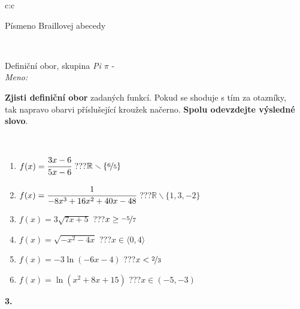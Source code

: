\documentclass[10pt]{report}
\begin{document}
\begin{tabular}{c:c}
\begin{minipage}[c][104.5mm][t]{0.5\linewidth}
\begin{center}
\begin{minipage}{0.20\linewidth}
\begin{center}
{\small Písmeno Braillovej abecedy}
\end{center}
\end{minipage}
\end{center}
\end{minipage}
\\ \hdashline
\begin{minipage}[c][104.5mm][t]{0.5\linewidth}
\begin{center}
\vspace{7mm}
{\huge Definiční obor, skupina \textit{Pi $\pi$} -}\\[5mm]
\textit{Meno:}\phantom{xxxxxxxxxxxxxxxxxxxxxxxxxxxxxxxxxxxxxxxxxxxxxxxxxxxxxxxxxxxxxxxxx}\\[5mm]
\begin{minipage}{0.95\linewidth}
\textbf{Zjisti definiční obor} zadaných funkcí. Pokud se shoduje s tím za otazníky,\\tak napravo obarvi příslušející kroužek načerno. \textbf{Spolu odevzdejte výsledné slovo}.
\end{minipage}
\\[1mm]
\begin{minipage}{0.79\linewidth}
\begin{center}
\begin{varwidth}{\linewidth}
\begin{enumerate}
\normalsizerrr
\item $f(x)=\cfrac{3x-6}{5x-6}$\quad \dotfill\; ???\;\dotfill \quad $\mathbb{R}\smallsetminus\{\nicefrac{6}{5}\}$
\item $f(x)=\cfrac{1}{-8x^3+16x^2+40x-48}$\quad \dotfill\; ???\;\dotfill \quad $\mathbb{R}\smallsetminus\{1,3,-2\}$
\item $f(x)=3\sqrt{7x+5}$\quad \dotfill\; ???\;\dotfill \quad $x\geq\nicefrac{-5}{7}$
\item $f(x)=\sqrt{-x^2-4x}$\quad \dotfill\; ???\;\dotfill \quad $x\in\langle0 , 4\rangle$
\item $f(x)=-3\ln{(-6x-4)}$\quad \dotfill\; ???\;\dotfill \quad $x<\nicefrac{2}{3}$
\item $f(x)=\ln{(x^2+8x+15)}$\quad \dotfill\; ???\;\dotfill \quad $x\in(-5 , -3)$
\end{enumerate}
\end{varwidth}
\end{center}
\end{minipage}
\begin{minipage}{0.20\linewidth}
\begin{center}
{\Huge\bfseries 3.} \\[2mm]

\end{center}
\end{minipage}
\end{center}
\end{minipage}
\end{tabular}
\end{document}
